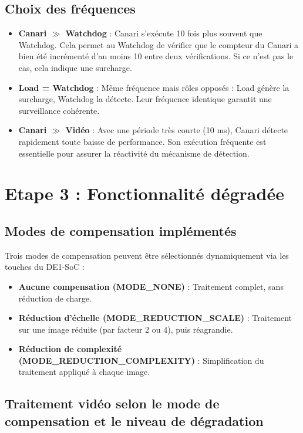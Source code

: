 \documentclass[a4paper,12pt]{article}
\begin{document}
\subsection{Choix des fréquences}

\begin{itemize}
    \item \textbf{Canari $\gg$ Watchdog} : Canari s’exécute 10 fois plus souvent que Watchdog. Cela permet au Watchdog de vérifier que le compteur du Canari a bien été incrémenté d’au moins 10 entre deux vérifications. Si ce n’est pas le cas, cela indique une surcharge.
    \item \textbf{Load = Watchdog} : Même fréquence mais rôles opposés : Load génère la surcharge, Watchdog la détecte. Leur fréquence identique garantit une surveillance cohérente.
    \item \textbf{Canari $\gg$ Vidéo} : Avec une période très courte (10 ms), Canari détecte rapidement toute baisse de performance. Son exécution fréquente est essentielle pour assurer la réactivité du mécanisme de détection.
\end{itemize}

\newpage

\section{Etape 3 : Fonctionnalité dégradée}

\subsection*{Modes de compensation implémentés}

Trois modes de compensation peuvent être sélectionnés dynamiquement via les touches du DE1-SoC :
\begin{itemize}
    \item \textbf{Aucune compensation (MODE\_NONE)} : Traitement complet, sans réduction de charge.
    \item \textbf{Réduction d'échelle (MODE\_REDUCTION\_SCALE)} : Traitement sur une image réduite (par facteur 2 ou 4), puis réagrandie.
    \item \textbf{Réduction de complexité (MODE\_REDUCTION\_COMPLEXITY)} : Simplification du traitement appliqué à chaque image.
\end{itemize}

\subsection{Traitement vidéo selon le mode de compensation et le niveau de dégradation}
\end{document}
